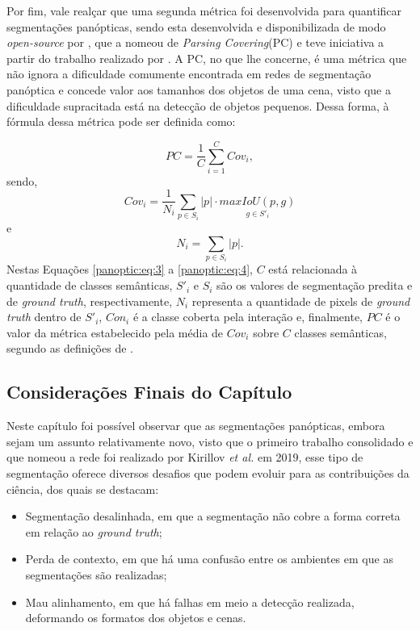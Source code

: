 Por fim, vale realçar que uma segunda métrica foi desenvolvida para quantificar segmentações panópticas, sendo esta desenvolvida e disponibilizada de modo \textit{open-source} por \cite{Yang2019}, que a nomeou de \textit{Parsing Covering}(PC) e teve iniciativa a partir do trabalho realizado por \cite{Arbelaez2011}. A PC, no que lhe concerne, é uma métrica que não ignora a dificuldade comumente encontrada em redes de segmentação panóptica e concede valor aos tamanhos dos objetos de uma cena, visto que a dificuldade supracitada está na detecção de objetos pequenos. Dessa forma, à fórmula dessa métrica pode ser definida como:

\begin{equation}
    \label{panoptic:eq:3}
    PC = \frac{1}{C} \underset{i=1}{\overset{C}{\sum}}Cov_i,
\end{equation}
sendo,
\begin{equation}
    \label{panoptic:eq:4}
    Cov_i = \frac{1}{N_i}\underset{p \in S_i}{\sum} |p|\cdot \underset{g \in S'_i}{max IoU(p,g)}
\end{equation}
e
\begin{equation}
    \label{panoptic:eq:5}
    N_i = \underset{p \in S_i}{\sum} |p|.
\end{equation}
Nestas Equações \ref{panoptic:eq:3} a \ref{panoptic:eq:4}, $C$ está relacionada à quantidade de classes semânticas, $S'_i$ e $S_i$ são os valores de segmentação predita e de \textit{ground truth}, respectivamente, $N_i$ representa a quantidade de pixels de \textit{ground truth} dentro de $S'_i$, $Con_i$ é a classe coberta pela interação e, finalmente, $PC$ é o valor da métrica estabelecido pela média de $Cov_i$ sobre $C$ classes semânticas, segundo as definições de \cite{Yang2019}.


\subsection{Considerações Finais do Capítulo}
\label{panoptic:conclusion}
Neste capítulo foi possível observar que as segmentações panópticas, embora sejam um assunto relativamente novo, visto que o primeiro trabalho consolidado e que nomeou a rede foi realizado por Kirillov \textit{et al.} \cite{Kirillov2019a} em 2019, esse tipo de segmentação oferece diversos desafios que podem evoluir para as contribuições da ciência, dos quais se destacam:
 
 \begin{itemize}
     \item Segmentação desalinhada, em que a segmentação não cobre a forma correta em relação ao \textit{ground truth};
     \item Perda de contexto, em que há uma confusão entre os ambientes em que as segmentações são realizadas;
     \item Mau alinhamento, em que há falhas em meio a detecção realizada, deformando os formatos dos objetos e cenas.
 \end{itemize}

